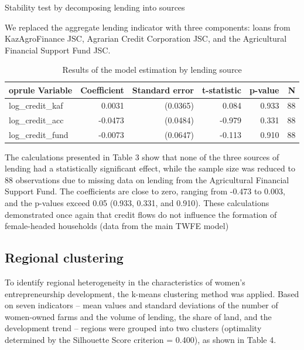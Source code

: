 \documentclass[pdflatex,sn-mathphys-ay]{sn-jnl}
\begin{document}
Stability test by decomposing lending into sources

We replaced the aggregate lending indicator with three components: loans
from KazAgroFinance JSC, Agrarian Credit Corporation JSC, and the
Agricultural Financial Support Fund JSC.

\begin{table}[htbp]
\caption{Results of the model estimation by lending source}\label{tab:lending-source}%
\small
\begin{tabular*}{\textwidth}{@{\extracolsep{\fill}}p{}rrrrr@{}}
	oprule
Variable & Coefficient & Standard error & t-statistic & p-value & N\\
\midrule
log\_credit\_kaf & 0.0031 & (0.0365) & 0.084 & 0.933 & 88\\
log\_credit\_acc & -0.0473 & (0.0484) & -0.979 & 0.331 & 88\\
log\_credit\_fund & -0.0073 & (0.0647) & -0.113 & 0.910 & 88\\
\bottomrule
\end{tabular*}
\end{table}

The calculations presented in Table 3 show that none of the three
sources of lending had a statistically significant effect, while the
sample size was reduced to 88 observations due to missing data on
lending from the Agricultural Financial Support Fund. The coefficients
are close to zero, ranging from -0.473 to 0.003, and the p-values exceed
0.05 (0.933, 0.331, and 0.910). These calculations demonstrated once
again that credit flows do not influence the formation of female-headed
households (data from the main TWFE model)

\subsection{Regional clustering}

To identify regional heterogeneity in the characteristics of women's
entrepreneurship development, the k-means clustering method was applied.
Based on seven indicators -- mean values and standard deviations of the
number of women-owned farms and the volume of lending, the share of
land, and the development trend -- regions were grouped into two
clusters (optimality determined by the Silhouette Score criterion =
0.400), as shown in Table 4.
\end{document}
